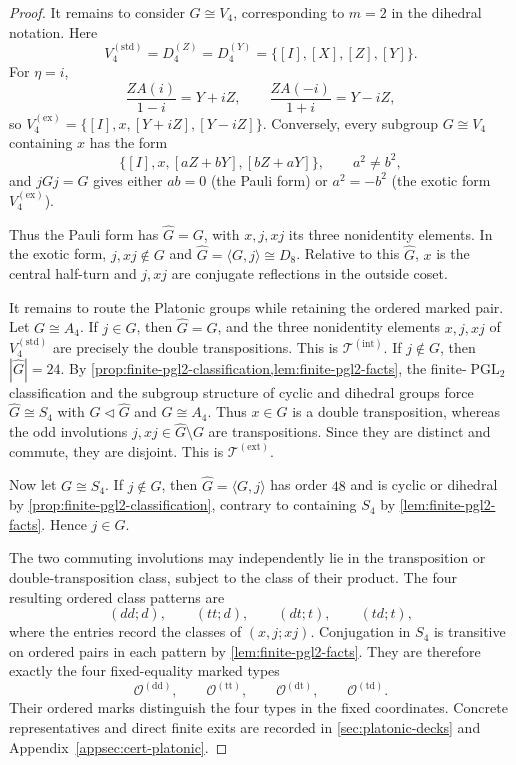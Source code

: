 \documentclass[11pt,letterpaper,onecolumn]{article}
\theoremstyle{plain}
\theoremstyle{definition}
\theoremstyle{remark}
\newcommand{\DihZ}[1]{{D_{#1}^{(Z)}}}
\newcommand{\DihY}[1]{{D_{#1}^{(Y)}}}
\newcommand{\KleinStd}{{V_4^{(\mathrm{std})}}}
\newcommand{\KleinEx}{{V_4^{(\mathrm{ex})}}}
\newcommand{\TetInt}{{\mathcal T^{(\mathrm{int})}}}
\newcommand{\TetExt}{{\mathcal T^{(\mathrm{ext})}}}
\newcommand{\OctDD}{{\mathcal O^{(\mathrm{dd})}}}
\newcommand{\OctTT}{{\mathcal O^{(\mathrm{tt})}}}
\newcommand{\OctDT}{{\mathcal O^{(\mathrm{dt})}}}
\newcommand{\OctTD}{{\mathcal O^{(\mathrm{td})}}}
\newcommand{\PGL}{\operatorname{PGL}}
\begin{document}
\begin{proof}
It remains to consider \(G\cong V_4\), corresponding to \(m=2\) in the
dihedral notation.  Here
\[
 \KleinStd=\DihZ{4}=\DihY{4}=\{[I],[X],[Z],[Y]\}.
\]
For \(\eta=i\),
\[
 \frac{ZA(i)}{1-i}=Y+iZ,\qquad
 \frac{ZA(-i)}{1+i}=Y-iZ,
\]
so \(\KleinEx=\{[I],x,[Y+iZ],[Y-iZ]\}\). Conversely, every subgroup \(G\cong V_4\) containing \(x\) has the form
\[
 \{[I],x,[aZ+bY],[bZ+aY]\},\qquad a^2\ne b^2,
\]
and \(jGj=G\) gives either \(ab=0\) (the Pauli form) or
\(a^2=-b^2\) (the exotic form \(\KleinEx\)).

Thus the Pauli form has \(\widehat G=G\), with \(x,j,xj\) its three nonidentity
elements.  In the exotic form, \(j,xj\notin G\) and
\(\widehat G=\langle G,j\rangle\cong D_8\). Relative to this \(\widehat G\), \(x\) is the central
half-turn and \(j,xj\) are conjugate reflections in the outside coset.

It remains to route the Platonic groups while retaining the ordered marked
pair.  Let \(G\cong A_4\).  If \(j\in G\), then \(\widehat G=G\), and the three
nonidentity elements \(x,j,xj\) of \(\KleinStd\) are precisely the
double transpositions.  This is \(\TetInt\).  If \(j\notin G\), then
\(|\widehat G|=24\).  By
\cref{prop:finite-pgl2-classification,lem:finite-pgl2-facts}, the
finite-\(\PGL_2\) classification and the subgroup structure of cyclic and
dihedral groups force
\(\widehat G\cong S_4\) with \(G\triangleleft\widehat G\) and \(G\cong A_4\).  Thus \(x\in G\) is a
double transposition, whereas the odd involutions \(j,xj\in \widehat G\setminus G\)
are transpositions.  Since they are distinct and commute, they are disjoint.
This is \(\TetExt\).

Now let \(G\cong S_4\). If \(j\notin G\), then
\(\widehat G=\langle G,j\rangle\) has order \(48\) and is cyclic or dihedral by
\cref{prop:finite-pgl2-classification}, contrary to containing \(S_4\)
by \cref{lem:finite-pgl2-facts}. Hence \(j\in G\).

  The two commuting involutions may independently lie in the transposition
  or double-transposition class, subject to the class of their product.  The
  four resulting ordered class patterns are
  \[
    (dd;d),\qquad (tt;d),\qquad (dt;t),\qquad (td;t),
  \]
  where the entries record the classes of \((x,j;xj)\).  Conjugation in
  \(S_4\) is transitive on ordered pairs in each pattern by
  \cref{lem:finite-pgl2-facts}.  They are therefore exactly the four
  fixed-equality marked types
  \[
    \OctDD,\qquad \OctTT,\qquad
    \OctDT,\qquad \OctTD.
  \]
  Their ordered marks distinguish the four types in the fixed coordinates.
  Concrete representatives and direct finite exits are recorded in
  \cref{sec:platonic-decks} and
  Appendix~\ref{appsec:cert-platonic}.


\end{proof}
\end{document}

